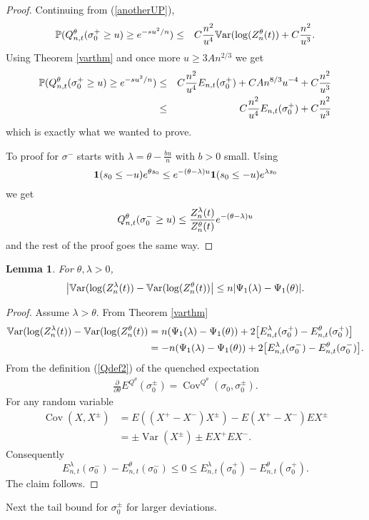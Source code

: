\documentclass[11pt]{amsart}
\newtheorem{lemma}[theorem]{\sc Lemma}
\numberwithin{equation}{section}
\theoremstyle{remark}
\providecommand{\abs}[1]{\vert#1\vert}
\begin{document}
\begin{proof}
Continuing from (\ref{anotherUP}), 
\begin{eqnarray}{\nonumber}
{\mathbb{P}}(Q^{\theta}_{n,t}(\sigma_0^+\ge u)\ge e^{-su^2/n})
&\le& C \frac{n^2}{u^4}{{\rm\mathbb{V}ar}}(\log( Z_n^{\theta}(t)) + C\frac{n^2}{u^3}. 
\end{eqnarray}
Using Theorem \ref{varthm} and once more $u\ge 3An^{2/3}$  we get
\begin{eqnarray}{\nonumber}
{\mathbb{P}}(Q^{\theta}_{n,t}(\sigma_0^+\ge u)\ge e^{-su^2/n}) 
&\le& C \frac{n^2}{u^4}E_{n,t} (\sigma_0^+) +CA n^{8/3} u^{-4} + C\frac{n^2}{u^3}\\ {\nonumber} 
&\le&  C \frac{n^2}{u^4}E_{n,t} (\sigma_0^+) +C \frac{n^2}{u^3}
\end{eqnarray}
which is exactly what we wanted to prove.

To proof for $\sigma^-$ starts with  $\lambda={\theta}-\frac{bu}{n}$ with $b>0$ small. 
Using  \begin{equation}{\nonumber} {\mathbf{1}}(s_0\le -u) e^{{\theta} s_0}\le e^{-({\theta}-\lambda) u} {\mathbf{1}}(s_0\le -u) e^{\lambda s_0}\end{equation}
we get
\begin{equation}{\nonumber}
Q_{n,t}^{\theta}(\sigma_0^{-}\ge u)\le \frac{Z_{n}^{\lambda}(t)}{Z_n^{\theta}(t)} e^{-({\theta}-\lambda)u}
\end{equation} 
and the rest of the proof goes the same way.
\end{proof}

\begin{lemma}\label{4.1lem}
For  ${\theta},  \lambda>0$,   
\[
\bigl\lvert {{\rm\mathbb{V}ar}}(\log( Z_n^{\lambda}(t)) - {{\rm\mathbb{V}ar}}(\log( Z_n^{\theta}(t)) \bigr\rvert 
\le  n\abs{{\Psi_1}(\lambda)-{\Psi_1}({\theta})}.  
\]
\end{lemma}
\begin{proof}
Assume $\lambda>{\theta}$.  From Theorem \ref{varthm}
\begin{align*}
{{\rm\mathbb{V}ar}}(\log( Z_n^{\lambda}(t))-{{\rm\mathbb{V}ar}}(\log( Z_n^{\theta}(t))&=n({\Psi_1}(\lambda)-{\Psi_1}({\theta}))
+2 \bigl[ E^\lambda_{n,t} (\sigma_0^+) -  E^{\theta}_{n,t} (\sigma_0^+)\bigr]\\
&=-n({\Psi_1}(\lambda)-{\Psi_1}({\theta}))+2 \bigl[ E^\lambda_{n,t} (\sigma_0^-) - 
 E^{\theta}_{n,t} (\sigma_0^-)\bigr].
\end{align*} 
From the definition (\ref{Qdef2}) of  the quenched expectation  
\begin{align*}
\frac\partial{\partial{\theta}}E^{Q^{\theta}} (\sigma_0^{\pm})= \operatorname{Cov}^{Q^{\theta}}(\sigma_0,\sigma_0^{\pm}). 
\end{align*}
For any random variable 
\begin{align*}
\operatorname{Cov}(X,X^{\pm})&=E ((X^+-X^-)X^\pm)-E (X^+-X^-)E X^\pm \\
&=\pm\operatorname{Var} (X^\pm) \pm E X^+ E X^-. 
\end{align*}
Consequently 
\[
 E^\lambda_{n,t} (\sigma_0^-) -  E^{\theta}_{n,t} (\sigma_0^-)\le 0 \le
E^\lambda_{n,t} (\sigma_0^+) -  E^{\theta}_{n,t} (\sigma_0^+).   
\]
The claim follows. 
\end{proof}
Next the tail bound for $\sigma_0^\pm$ for larger deviations.  
\end{document}
